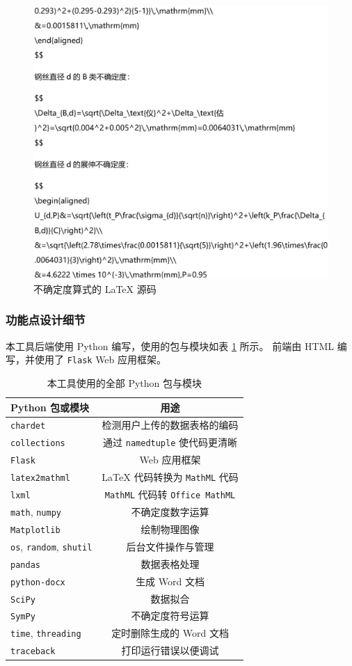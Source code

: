 \begin{figure}[htbp]
  \centering
  \includegraphics[width=0.67\columnwidth]{figure/latex.png}
  \caption{不确定度算式的 \LaTeX{} 源码}
  \label{fig:latex}
\end{figure}

\subsubsection{功能点设计细节}

本工具后端使用 Python 编写，使用的包与模块如表 \ref{tab:pkg} 所示。
前端由 HTML 编写，并使用了 \verb|Flask| Web 应用框架。

\begin{table}[htbp]
  \caption{本工具使用的全部 Python 包与模块}
  \label{tab:pkg}
  \vskip 0.1in
  \centering\small
  \begin{tabular}{lc}
  \toprule
  Python 包或模块 & 用途 \\
  \midrule
  \verb|chardet| & 检测用户上传的数据表格的编码 \\
  \verb|collections| & 通过 \verb|namedtuple| 使代码更清晰 \\
  \verb|Flask| & Web 应用框架 \\
  \verb|latex2mathml| & \LaTeX{} 代码转换为 \verb|MathML| 代码 \\
  \verb|lxml| & \verb|MathML| 代码转 \verb|Office MathML| \\
  \verb|math|, \verb|numpy| & 不确定度数字运算 \\
  \verb|Matplotlib| & 绘制物理图像 \\
  \verb|os|, \verb|random|, \verb|shutil| & 后台文件操作与管理 \\
  \verb|pandas| & 数据表格处理 \\
  \verb|python-docx| & 生成 Word 文档 \\
  \verb|SciPy| & 数据拟合 \\
  \verb|SymPy| & 不确定度符号运算 \\
  \verb|time|, \verb|threading| & 定时删除生成的 Word 文档 \\
  \verb|traceback| & 打印运行错误以便调试 \\
  \bottomrule
  \end{tabular}
  \vskip -0.1in
\end{table}

